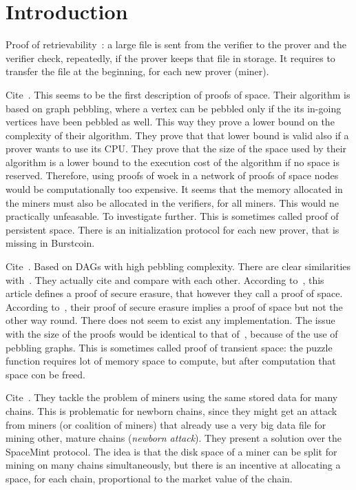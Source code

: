 \section{Introduction}\label{sec:introduction}

Proof of retrievability~\cite{JuelsK07}: a large file
is sent from the verifier to the prover and the verifier
check, repeatedly, if the prover keeps that file in storage. It requires to transfer the file
at the beginning, for each new prover (miner).

Cite~\cite{DziembowskiFKP15}. This seems to be the first description of proofs of space.
Their algorithm is based on graph pebbling, where a vertex can be pebbled only if the
its in-going vertices have been pebbled as well. This way they prove a lower bound on the
complexity of their algorithm. They prove that that lower bound is valid also if a prover
wants to use its CPU. They prove that the size of the space used by their algorithm
is a lower bound to the execution cost of the algorithm if no space is reserved.
Therefore, using proofs of woek in a network of proofs of space nodes would
be computationally too expensive. It seems that the memory allocated in the miners
must also be allocated in the verifiers, for all miners. This would ne practically unfeasable.
To investigate further.
This is sometimes called proof of persistent space.
There is an initialization protocol for each new prover, that is missing in Burstcoin.

Cite~\cite{AtenieseBFG14}. Based on DAGs with high pebbling complexity. There are clear similarities
with~\cite{DziembowskiFKP15}. They actually cite and compare with each other.
According to~\cite{DziembowskiFKP15}, this article defines a proof of secure erasure,
that however they call a proof of space. According to~\cite{DziembowskiFKP15},
their proof of secure erasure
implies a proof of space but not the other way round. There does not seem to exist
any implementation. The issue with the size of the proofs would be identical to that
of~\cite{DziembowskiFKP15}, because of the use of pebbling graphs.
This is sometimes called proof of transient space: the puzzle function requires lot of
memory space to compute, but after computation that space con be freed.

Cite~\cite{TangZDWLG0L19}. They tackle the problem of miners using the same stored data
for many chains. This is problematic for newborn chains, since they might get an attack
from miners (or coalition of miners) that already use a very big data file for mining other,
mature chains (\emph{newborn attack}). They present a solution over the SpaceMint protocol.
The idea is that the disk space of a miner can be split for mining on many chains
simultaneously, but there is an incentive at allocating a space, for each chain, proportional
to the market value of the chain.

